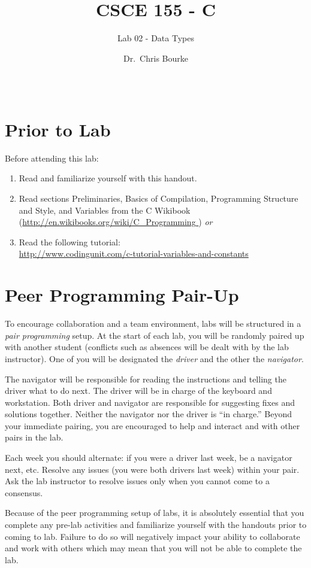 \documentclass[12pt]{scrartcl}
\title{CSCE 155 - C}
\subtitle{Lab 02 - Data Types}
\author{Dr.\ Chris Bourke}
\date{~}
\begin{document}
\maketitle

\section*{Prior to Lab}

Before attending this lab:
\begin{enumerate}
  \item Read and familiarize yourself with this handout.
  \item Read sections Preliminaries, Basics of Compilation,
  	Programming Structure and Style, and Variables from the C Wikibook
	(\url{http://en.wikibooks.org/wiki/C_Programming }) \emph{or}
  \item Read the following tutorial:\\
  	\url{http://www.codingunit.com/c-tutorial-variables-and-constants}
\end{enumerate}

\section*{Peer Programming Pair-Up}

To encourage collaboration and a team environment, labs will be
structured in a \emph{pair programming} setup.  At the start of
each lab, you will be randomly paired up with another student
(conflicts such as absences will be dealt with by the lab instructor).
One of you will be designated the \emph{driver} and the other
the \emph{navigator}.

The navigator will be responsible for reading the instructions and
telling the driver what to do next.  The driver will be in charge of the
keyboard and workstation.  Both driver and navigator are responsible
for suggesting fixes and solutions together.  Neither the navigator
nor the driver is ``in charge.''  Beyond your immediate pairing, you
are encouraged to help and interact and with other pairs in the lab.

Each week you should alternate: if you were a driver last week,
be a navigator next, etc.  Resolve any issues (you were both drivers
last week) within your pair.  Ask the lab instructor to resolve issues
only when you cannot come to a consensus.

Because of the peer programming setup of labs, it is absolutely
essential that you complete any pre-lab activities and familiarize
yourself with the handouts prior to coming to lab.  Failure to do
so will negatively impact your ability to collaborate and work with
others which may mean that you will not be able to complete the
lab.
\end{document}
